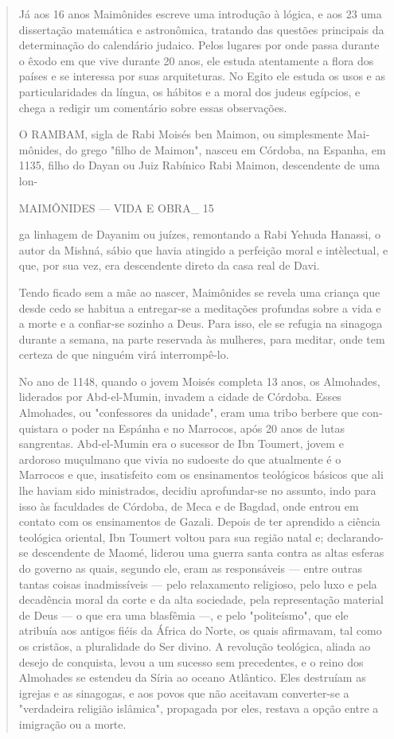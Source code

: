 \begin{quote}
Já aos 16 anos Maimônides escreve uma introdução à lógica, e aos 23 uma
dissertação matemática e astronômica, tratando das questões principais
da determinação do calendário judaico. Pelos lugares por onde passa
durante o êxodo em que vive durante 20 anos, ele estuda atentamente a
flora dos países e se interessa por suas arquiteturas. No Egito ele
estuda os usos e as particulari­dades da língua, os hábitos e a moral
dos judeus egípcios, e chega a redigir um comentário sobre essas
observações.

O RAMBAM, sigla de Rabi Moisés ben Maimon, ou simplesmente Mai­mônides,
do grego "filho de Maimon", nasceu em Córdoba, na Espanha, em 1135,
filho do Dayan ou Juiz Rabínico Rabi Maimon, descendente de uma lon-

MAIMÔNIDES --- VIDA E OBRA\_ 15

ga linhagem de Dayanim ou juízes, remontando a Rabi Yehuda Hanassi, o
autor da Mishná, sábio que havia atingido a perfeição moral e
intèlectual, e que, por sua vez, era descendente direto da casa real de
Davi.

Tendo ficado sem a mãe ao nascer, Maimônides se revela uma crian­ça que
desde cedo se habitua a entregar-se a meditações profundas sobre a vida
e a morte e a confiar-se sozinho a Deus. Para isso, ele se refugia na
sinagoga durante a semana, na parte reservada às mulheres, para meditar,
onde tem cer­teza de que ninguém virá interrompê-lo.

No ano de 1148, quando o jovem Moisés completa 13 anos, os Al­mohades,
liderados por Abd-el-Mumin, invadem a cidade de Córdoba. Esses
Almohades, ou "confessores da unidade", eram uma tribo berbere que
con­quistara o poder na Espánha e no Marrocos, após 20 anos de lutas
sangrentas. Abd-el-Mumin era o sucessor de Ibn Toumert, jovem e ardoroso
muçulmano que vivia no sudoeste do que atualmente é o Marrocos e que,
insatisfeito com os ensinamentos teológicos básicos que ali lhe haviam
sido ministrados, deci­diu aprofundar-se no assunto, indo para isso às
faculdades de Córdoba, de Me­ca e de Bagdad, onde entrou em contato com
os ensinamentos de Gazali. De­pois de ter aprendido a ciência teológica
oriental, Ibn Toumert voltou para sua região natal e; declarando-se
descendente de Maomé, liderou uma guerra santa contra as altas esferas
do governo as quais, segundo ele, eram as responsáveis --- entre outras
tantas coisas inadmissíveis --- pelo relaxamento religioso, pelo luxo e
pela decadência moral da corte e da alta sociedade, pela representação
material de Deus --- o que era uma blasfêmia ---, e pelo "politeísmo",
que ele atribuía aos antigos fiéis da África do Norte, os quais
afirmavam, tal como os cristãos, a pluralidade do Ser divino. A
revolução teológica, aliada ao desejo de conquista, levou a um sucesso
sem precedentes, e o reino dos Almohades se estendeu da Síria ao oceano
Atlântico. Eles destruíam as igrejas e as sinago­gas, e aos povos que
não aceitavam converter-se a "verdadeira religião islâmi­ca", propagada
por eles, restava a opção entre a imigração ou a morte.


\end{quote}
